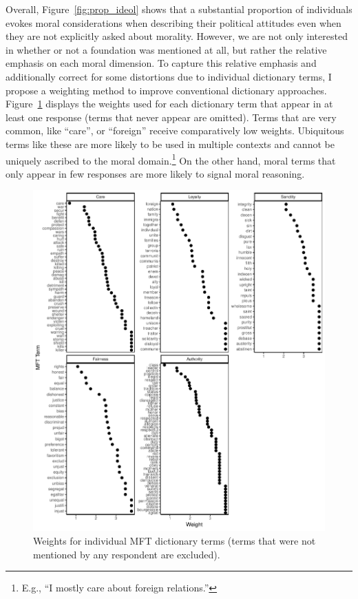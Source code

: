 \documentclass[12pt]{article}
\begin{document}
Overall, Figure~\ref{fig:prop_ideol} shows that a substantial proportion of individuals evokes moral considerations when describing their political attitudes even when they are not explicitly asked about morality. However, we are not only interested in whether or not a foundation was mentioned at all, but rather the relative emphasis on each moral dimension. To capture this relative emphasis and additionally correct for some distortions due to individual dictionary terms, I propose a weighting method to improve conventional dictionary approaches. Figure~\ref{fig:mft_weights} displays the weights used for each dictionary term that appear in at least one response (terms that never appear are omitted). Terms that are very common, like ``care'', or ``foreign'' receive comparatively low weights. Ubiquitous terms like these are more likely to be used in multiple contexts and cannot be uniquely ascribed to the moral domain.\footnote{E.g., ``I mostly care about foreign relations.''} On the other hand, moral terms that only appear in few responses are more likely to signal moral reasoning.

\begin{figure}[ht]\centering
\includegraphics{../calc/fig/app_mftweights.pdf}
\caption{Weights for individual MFT dictionary terms (terms that were not mentioned by any respondent are excluded).}\label{fig:mft_weights}
\end{figure}
\end{document}
